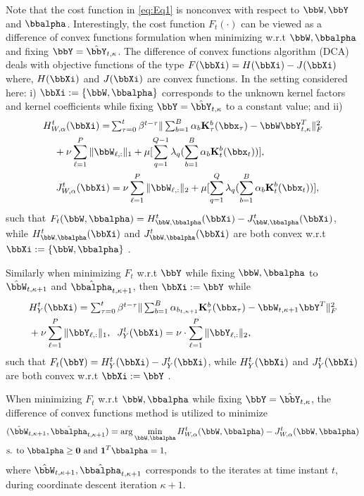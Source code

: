 \documentclass[10pt,final]{IEEEtran}
\begin{document}
Note that the cost function in \eqref{eq:Eq1} is nonconvex with respect to $\bbW,\bbY$ and $\bbalpha$. Interestingly, the cost function $F_t(\cdot)$   can be viewed as a difference of convex functions formulation \cite{Convex Analysis} when minimizing w.r.t  $\bbW,\bbalpha$ and fixing $\bbY=\hat{\bbY}_{t,\kappa}$. The difference of convex functions algorithm (DCA) \cite{Convex Analysis} deals with objective functions of the type $F(\bbXi)  = H(\bbXi) - J(\bbXi)$ where, $H(\bbXi)$ and $J(\bbXi)$ are convex functions. In the setting considered here: i) $\bbXi:=\{\bbW,\bbalpha\}$ corresponds to the unknown kernel factors and kernel coefficients while fixing $\bbY=\hat{\bbY}_{t,\kappa}$ to a constant value; and ii)
\begin{align}\label{eq:C_and_H}
   H_{W,\alpha}^{t}(\bbXi)=& \textstyle\sum_{\tau=0}^{t}\beta^{t-\tau}\|\sum_{b=1}^{B} {\alpha}_b \mathbf{K}_{\tau}^b(\bbx_{\tau})-\bbW\bbY_{t,\kappa}^T\|_F^2\nonumber\\
   &\hspace{-2cm}+\nu\sum_{\ell=1}^{P}\|\bbW_{\ell,:}\|_1+\mu[\sum_{q=1}^{Q-1}\lambda_{q}(\sum_{b=1}^{B}\alpha_b \mathbf{K}_{t}^b(\bbx_{t}))],\\
   J_{W,\alpha}^{t}(\bbXi)&= \nu\sum_{\ell=1}^{P}\|\bbW_{\ell,:}\|_2+\mu[\sum_{q=1}^{Q}\lambda_{q}(\sum_{b=1}^{B}\alpha_b \mathbf{K}_{t}^b(\bbx_{t}))],\nonumber
\end{align}
such that $F_t(\bbW,\bbalpha)=H_{\bbW,\bbalpha}^{t}(\bbXi)-J_{\bbW,\bbalpha}^{t}(\bbXi)$, while $H_{\bbW,\bbalpha}^{t}(\bbXi)$ and $J_{\bbW,\bbalpha}^{t}(\bbXi)$ are both convex w.r.t  $\bbXi:=\{\bbW,\bbalpha\}$ \cite{Convex}. 

Similarly when minimizing $F_t$ w.r.t  $\bbY$ while fixing $\bbW,\bbalpha$
to $\hat{\bbW}_{t,\kappa+1}$ and $\hat{\bbalpha}_{t,\kappa+1}$, then 
$\bbXi:=\bbY$ while
\begin{align}\label{eq:C_and_H}
   &H_Y^t(\bbXi)= \textstyle\sum_{\tau=0}^{t}\beta^{t-\tau}\|\sum_{b=1}^{B} {\alpha}_{b_{t,\kappa+1}} \mathbf{K}_{\tau}^b(\bbx_{\tau})-\bbW_{t,\kappa+1}\bbY^T\|_F^2\nonumber\\
   &+\nu\sum_{\ell=1}^{P}\|\bbY_{\ell,:}\|_1,\;\;J_Y^t(\bbXi)= \nu\cdot\sum_{\ell=1}^{P}\|\bbY_{\ell,:}\|_2,
\end{align}
such that $F_t(\bbY)=H_{Y}^{t}(\bbXi)-J_{Y}^{t}(\bbXi)$, while $H_{Y}^{t}(\bbXi)$ and $J_{Y}^{t}(\bbXi)$ are both convex w.r.t $\bbXi:=\bbY$ \cite{Convex}. 

When minimizing $F_t$ w.r.t  $\bbW,\bbalpha$ while fixing $\bbY=\hat{\bbY}_{t,\kappa}$, the difference of convex functions method \cite{Convex Analysis} is utilized to minimize
\begin{align}\label{eq:DC_Walpha}
&(\hat{\bbW}_{t,\kappa+1},\hat{\bbalpha}_{t,\kappa+1})=\arg\min_{\bbW,\bbalpha}H_{W,\alpha}^t(\bbW,\bbalpha)-J_{W,\alpha}^t(\bbW,\bbalpha)\nonumber\\
&\textrm{s. to }\bbalpha\geq \mathbf{0}\textrm{ and }\mathbf{1}^T\bbalpha=1,
\end{align}
where $\hat{\bbW}_{t,\kappa+1},\hat{\bbalpha}_{t,\kappa+1}$ corresponds to the iterates at time instant $t$, during coordinate descent iteration $\kappa+1$. 
\end{document}
